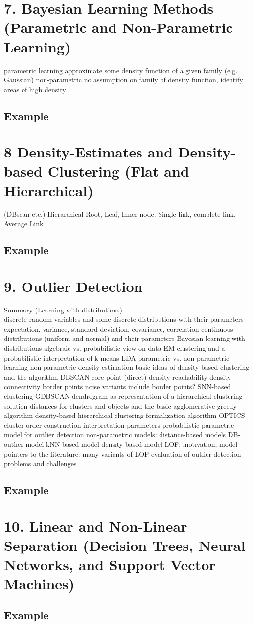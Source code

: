 \documentclass[a4paper,10pt,titlepage]{report}
\begin{document}
\newpage
\section{7.	Bayesian Learning Methods (Parametric and Non-Parametric Learning)}
	parametric learning
		approximate some density function of a given family (e.g. Gaussian)
	non-parametric
		no assumption on family of density function, identify areas of high density
\subsection{Example}



\newpage
\section{8	Density-Estimates and Density-based Clustering (Flat and Hierarchical)}
	(DBscan etc.)
	Hierarchical
		Root, Leaf, Inner node.
	Single link, complete link, Average Link
\subsection{Example}




\newpage
\section{9.	Outlier Detection}
Summary (Learning with distributions)\\
	discrete random variables and some discrete distributions with their parameters\\
	expectation, variance, standard deviation, covariance, correlation
	continuous distributions (uniform and normal) and their parameters
	Bayesian learning with distributions
	algebraic vs. probabilistic view on data
		EM clustering and a probabilistic interpretation of k-means
		LDA
	parametric vs. non parametric learning
	non-parametric density estimation
	basic ideas of density-based clustering and the algorithm DBSCAN
		core point
		(direct) density-reachability
		density-connectivity
		border points
		noise
	variants
		include border points?
		SNN-based clustering
		GDBSCAN
	dendrogram as representation of a hierarchical clustering solution
	distances for clusters and objects and the basic agglomerative greedy algorithm
	density-based hierarchical clustering
		formalization
		algorithm OPTICS
		cluster order
			construction
			interpretation
			parameters
	probabilistic parametric model for outlier detection
	non-parametric models:
		distance-based models
			DB-outlier model
			kNN-based model
		density-based model
			LOF: motivation, model
			pointers to the literature: many variants of LOF
	evaluation of outlier detection
	problems and challenges
\subsection{Example}

\newpage
\section{10. Linear and Non-Linear Separation (Decision Trees, Neural Networks, and Support
Vector Machines)}

\subsection{Example}
\end{document}
